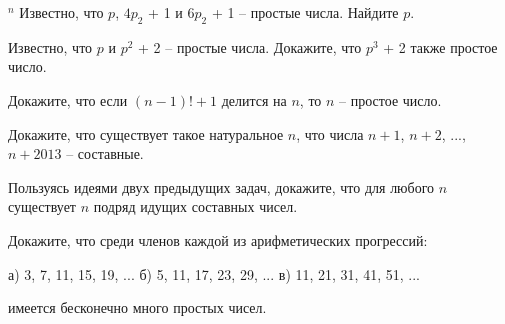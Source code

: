 \begin{thm} $^n$
    Известно, что $p$, $4p_2$ + 1 и $6p_2$ + 1 -- простые числа. Найдите $p$.
\end{thm}

\begin{thm}
    Известно, что $p$ и $p^2$ + 2 -- простые числа. Докажите, что $p^3$ + 2 также простое число.
\end{thm}

\begin{thm}
    Докажите, что если $(n - 1)! + 1$ делится на $n$, то $n$ -- простое число.
\end{thm}

\begin{thm}
    Докажите, что существует такое натуральное $n$, что числа $n + 1$, $n + 2$, ..., $n + 2013$ -- составные.
\end{thm}

\begin{thm}
    Пользуясь идеями двух предыдущих задач, докажите, что для любого $n$ существует $n$ подряд идущих составных чисел.
\end{thm}

\begin{thm}
    Докажите, что среди членов каждой из арифметических прогрессий:
    \par а) 3, 7, 11, 15, 19, ... \hfill б) 5, 11, 17, 23, 29, ... \hfill в) 11, 21, 31, 41, 51, ...
    \par имеется бесконечно много простых чисел.
\end{thm}